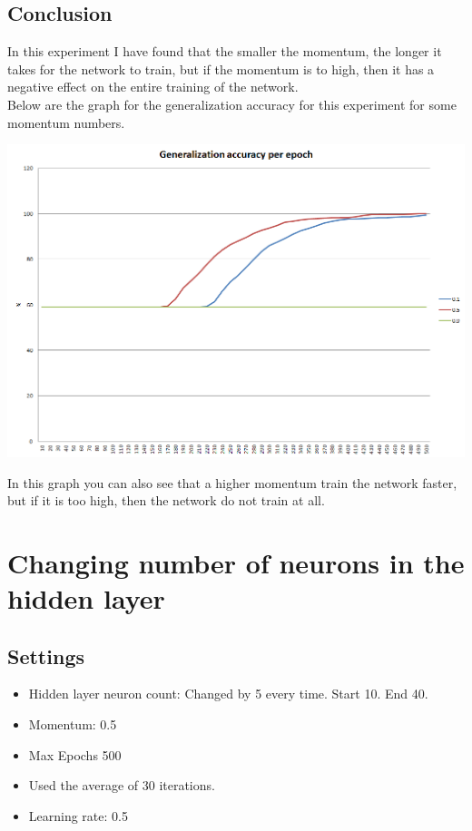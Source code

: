 \documentclass[pdftex,10pt,a4paper]{report}
\begin{document}
\subsection{Conclusion}
In this experiment I have found that the smaller the momentum, the longer it takes for the network to train, but if the momentum is to high, then it has a negative effect on the entire training of the network. \\
Below are the graph for the generalization accuracy for this experiment for some momentum numbers.
\begin{center}
	\includegraphics[scale=0.5]{charts/other_1_ag}
\end{center}
In this graph you can also see that a higher momentum train the network faster, but if it is too high, then the network do not train at all.
\section{Changing number of neurons in the hidden layer}
\subsection{Settings}
\begin{itemize}
	\item Hidden layer neuron count: Changed by 5 every time. Start 10. End 40.
	\item Momentum: 0.5
	\item Max Epochs 500
	\item Used the average of 30 iterations. 
	\item Learning rate: 0.5  
\end{itemize}
\end{document}
